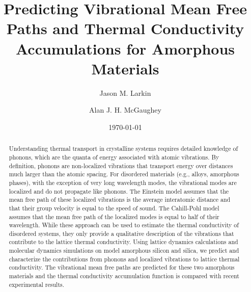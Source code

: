 \documentclass[aps,prb,twocolumn,superscriptaddress,footinbib,amsmath,amssymb,floatfix]{revtex4}
\begin{document}
\title{Predicting Vibrational Mean Free Paths and Thermal Conductivity 
Accumulations for Amorphous Materials}
\author{Jason M. Larkin}
\author{Alan J. H. McGaughey}
\date{\today}
\begin{abstract}
Understanding thermal transport in crystalline systems requires detailed 
knowledge of phonons, which are the quanta of energy associated with atomic 
vibrations. By definition, phonons are non-localized vibrations that 
transport energy over distances much larger than the atomic spacing. For 
disordered materials (e.g., alloys, amorphous phases), with the exception 
of very long wavelength modes, the vibrational modes are localized and do 
not propagate like phonons. The Einstein model assumes that the mean free 
path of these localized vibrations is the average interatomic distance and 
that their group velocity is equal to the speed of sound. The Cahill-Pohl 
model assumes that the mean free path of the localized modes is equal to 
half of their wavelength. While these approach can be used to estimate the 
thermal conductivity of disordered systems, they only 
provide a qualitative description of the vibrations that contribute to the 
lattice thermal conductivity.
Using lattice dynamics calculations and molecular dynamics simulations on 
model amorphous silicon and silica, we predict and 
characterize the contributions from phonons and localized vibrations to 
lattice thermal conductivity. The vibrational mean free paths are 
predicted for these two amorphous materials and the thermal 
conductivity accumulation function is compared with recent experimental 
results.

\end{abstract}
\maketitle
\clearpage
\end{document}
